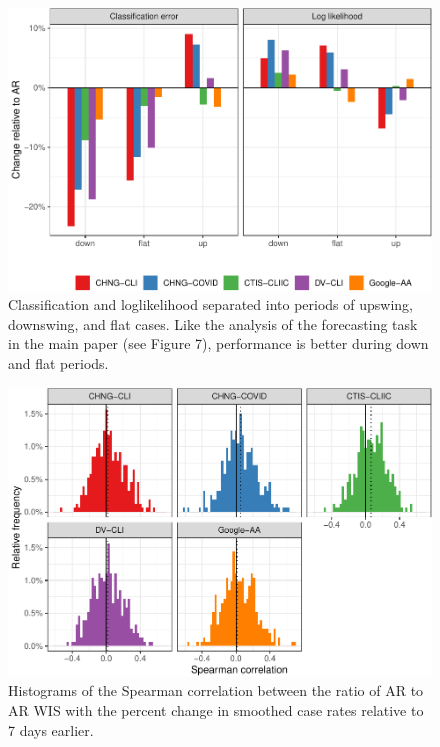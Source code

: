 \documentclass[9pt,twoside,lineno]{pnas-new}
\begin{document}
\clearpage

\begin{figure}

{\centering \includegraphics[width=\textwidth]{fig/hotspots-upswing-downswing-1} 

}

\caption{Classification and loglikelihood separated into periods of upswing, downswing, and flat cases. Like the analysis of the forecasting task in the main paper (see Figure 7), performance is better during down and flat periods.}\label{fig:hotspots-upswing-downswing}
\end{figure}

\clearpage

\begin{figure}

{\centering \includegraphics[width=\textwidth]{fig/cor-wis-ratio-1} 

}

\caption{Histograms of the Spearman correlation between the ratio of AR to AR WIS with the percent change in smoothed case rates relative to 7 days earlier.}\label{fig:cor-wis-ratio}
\end{figure}
\end{document}
